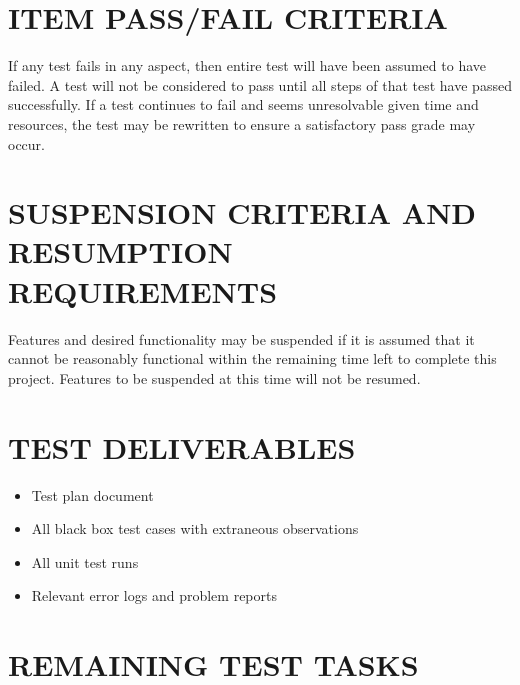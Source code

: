 \documentclass[twoside,letterpaper]{article}
\begin{document}
\section[ITEM PASS/FAIL CRITERIA]
{\bfseries ITEM PASS/FAIL CRITERIA}

If any test fails in any aspect, then entire test will have been assumed to have failed. A test will not be considered to pass until all steps of that test have passed successfully. If a test continues to fail and seems unresolvable given time and resources, the test may be rewritten to ensure a satisfactory pass grade may occur.


\section[SUSPENSION CRITERIA]
{\bfseries SUSPENSION CRITERIA AND RESUMPTION 
\\REQUIREMENTS}

Features and desired functionality may be suspended if it is assumed that it cannot be reasonably functional within the remaining time left to complete this project. 
Features to be suspended at this time will not be resumed.

\section[TEST DELIVERABLES]
{\bfseries TEST DELIVERABLES}

\begin{itemize}
\item Test plan document
\item All black box test cases with extraneous observations
\item All unit test runs 
\item Relevant error logs and problem reports
\end{itemize}

\section[REMAINING TEST TASKS]{\bfseries REMAINING TEST TASKS}
\end{document}
